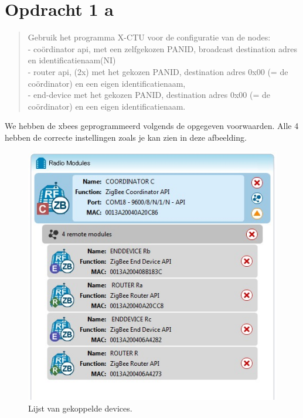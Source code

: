 \documentclass[12pt]{article}
\begin{document}
\clearpage

{}
\section*{Opdracht 1 a}
\begin{quote}
Gebruik het programma X-CTU voor de configuratie van de nodes: \\
- coördinator api, met een zelfgekozen PANID, broadcast destination adres en identificatienaam(NI) \\
- router api, (2x) met het gekozen PANID, destination adres 0x00 (= de coördinator) en een eigen identificatienaam,\\
- end-device met het gekozen PANID, destination adres 0x00 (= de coördinator) en een eigen identificatienaam.
\end{quote}
We hebben de xbees geprogrammeerd volgends de opgegeven voorwaarden. Alle 4 hebben de correcte instellingen zoals je kan zien in deze afbeelding.
\begin{figure}[H]
\captionsetup{justification=raggedright,
singlelinecheck=false
}
\includegraphics[scale=0.8] {1a-een}
\caption{Lijst van gekoppelde devices.}
\end{figure}
\end{document}
